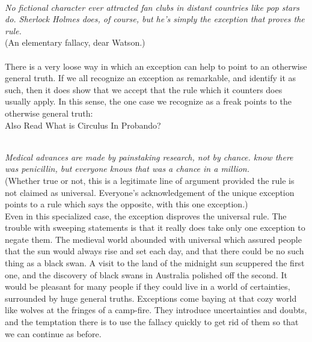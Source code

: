 \documentclass[a4paper,12pt,single,pdftex]{scrartcl}
\begin{document}
    
       
    \\

    
      {\em No fictional character ever attracted fan clubs in distant countries like pop stars do. Sherlock Holmes does, of course, but he’s simply the exception that proves the rule.}
    \\

    
      (An elementary fallacy, dear Watson.)
    \\

    
       
    \\

    
      There is a very loose way in which an exception can help to point to an otherwise general truth. If we all recognize an exception as remarkable, and identify it as such, then it does show that we accept that the rule which it counters does usually apply. In this sense, the one case we recognize as a freak points to the otherwise general truth:
    \\

    
      

      
        Also Read  What is Circulus In Probando?
      
    
    
       
    \\

    
      {\em Medical advances are made by painstaking research, not by chance. know there was penicillin, but everyone knows that was a chance in a million.}
    \\

    
      (Whether true or not, this is a legitimate line of argument provided the rule is not claimed as universal. Everyone’s acknowledgement of the unique exception points to a rule which says the opposite, with this one exception.)
    \\

    
      Even in this specialized case, the exception disproves the universal rule. The trouble with sweeping statements is that it really does take only one exception to negate them. The medieval world abounded with universal which assured people that the sun would always rise and set each day, and that there could be no such thing as a black swan. A visit to the land of the midnight sun scuppered the first one, and the discovery of black swans in Australia polished off the second. It would be pleasant for many people if they could live in a world of certainties, surrounded by huge general truths. Exceptions come baying at that cozy world like wolves at the fringes of a camp-fire. They introduce uncertainties and doubts, and the temptation there is to use the fallacy quickly to get rid of them so that we can continue as before.
    \\
\end{document}
